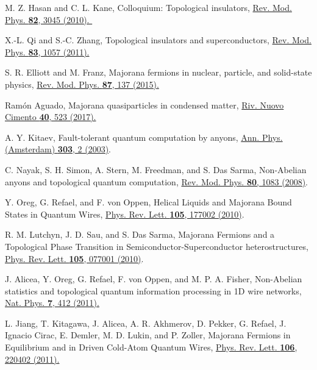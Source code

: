 \documentclass[twocolumn,prl,floatfix,citeautoscript,nofootinbib,superscriptaddress]{revtex4}
\begin{document}
\begin{thebibliography}{99}
 M. Z. Hasan and C. L. Kane, Colloquium: Topological
insulators, \href{https://doi.org/10.1103/RevModPhys.82.3045}{Rev. Mod.
Phys. \textbf{82}, 3045 (2010). }\

 X.-L. Qi and S.-C. Zhang, Topological insulators and
superconductors, \href{https://doi.org/10.1103/RevModPhys.83.1057}{Rev. Mod.
Phys. \textbf{83}, 1057 (2011).}

 S. R. Elliott and M. Franz, Majorana fermions in
nuclear, particle, and solid-state physics, \href{https://doi.org/10.1103/RevModPhys.87.137}%
{Rev. Mod. Phys. \textbf{87}, 137 (2015).}

 Ram\'{o}n Aguado, Majorana quasiparticles in condensed
matter, \href{https://arxiv.org/ct?url=https%3A%2F%2Fdx.doi.org%2F10.1393%2Fncr%2Fi2017-10141-9&v=303dee96}%
{Riv. Nuovo Cimento \textbf{40}, 523 (2017).}

 A. Y. Kitaev, Fault-tolerant quantum computation by
anyons, \href{https://doi.org/10.1016/S0003-4916(02)00018-0}{Ann. Phys.
(Amsterdam) \textbf{303}, 2 (2003)}.

 C. Nayak, S. H. Simon, A. Stern, M. Freedman, and S. Das
Sarma, Non-Abelian anyons and topological quantum computation, \href{https://doi.org/10.1103/RevModPhys.80.1083}%
{Rev. Mod. Phys. \textbf{80}, 1083 (2008)}.

 Y. Oreg, G. Refael, and F. von Oppen, Helical Liquids
and Majorana Bound States in Quantum Wires, \href{https://doi.org/10.1103/PhysRevLett.105.177002}%
{Phys. Rev. Lett. \textbf{105}, 177002 (2010)}.

 R. M. Lutchyn, J. D. Sau, and S. Das Sarma, Majorana
Fermions and a Topological Phase Transition in Semiconductor-Superconductor
heterostructures, \href{https://doi.org/10.1103/PhysRevLett.105.077001}{%
Phys. Rev. Lett. \textbf{105}, 077001 (2010)}.

 J. Alicea, Y. Oreg, G. Refael, F. von Oppen, and M. P.
A. Fisher, Non-Abelian statistics and topological quantum information
processing in 1D wire networks, \href{https://doi.org/10.1038/nphys1915}{%
Nat. Phys. \textbf{7}, 412 (2011).}

 L. Jiang, T. Kitagawa, J. Alicea, A. R. Akhmerov, D.
Pekker, G. Refael, J. Ignacio Cirac, E. Demler, M. D. Lukin, and P. Zoller,
Majorana Fermions in Equilibrium and in Driven Cold-Atom Quantum Wires,
\href{https://doi.org/10.1103/PhysRevLett.106.220402}{ Phys. Rev. Lett.
\textbf{106}, 220402 (2011).}


\end{thebibliography}
\end{document}

